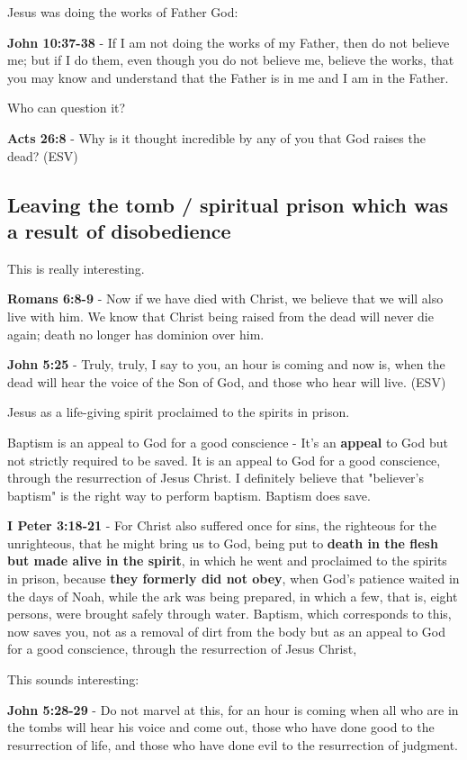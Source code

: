 \documentclass[11pt]{article}
\begin{document}
Jesus was doing the works of Father God:

\textbf{John 10:37-38} - If I am not doing the works of my Father, then do not believe me; but if I do them, even though you do not believe me, believe the works, that you may know and understand that the Father is in me and I am in the Father.

Who can question it?

\textbf{Acts 26:8} -  Why is it thought incredible by any of you that God raises the dead?  (ESV)

\subsection{Leaving the tomb / spiritual prison which was a result of disobedience}
\label{sec:orgbb1dc92}
This is really interesting.

\textbf{Romans 6:8-9} - Now if we have died with Christ, we believe that we will also live with him. We know that Christ being raised from the dead will never die again; death no longer has dominion over him.

\textbf{John 5:25} - Truly, truly, I say to you, an hour is coming and now is, when the dead will hear the voice of the Son of God, and those who hear will live. (ESV)

Jesus as a life-giving spirit proclaimed to the spirits in prison.

Baptism is an appeal to God for a good conscience - It's an \textbf{appeal} to God but not strictly required to be saved.
It is an appeal to God for a good conscience, through the resurrection of Jesus Christ.
I definitely believe that "believer's baptism" is the right way to perform baptism.
Baptism does save.

\textbf{I Peter 3:18-21} - For Christ also suffered once for sins, the righteous for the unrighteous, that he might bring us to God, being put to \textbf{death in the flesh but made alive in the spirit}, in which he went and proclaimed to the spirits in prison, because \textbf{they formerly did not obey}, when God's patience waited in the days of Noah, while the ark was being prepared, in which a few, that is, eight persons, were brought safely through water. Baptism, which corresponds to this, now saves you, not as a removal of dirt from the body but as an appeal to God for a good conscience, through the resurrection of Jesus Christ,

This sounds interesting:

\textbf{John 5:28-29} - Do not marvel at this, for an hour is coming when all who are in the tombs will hear his voice and come out, those who have done good to the resurrection of life, and those who have done evil to the resurrection of judgment.
\end{document}
